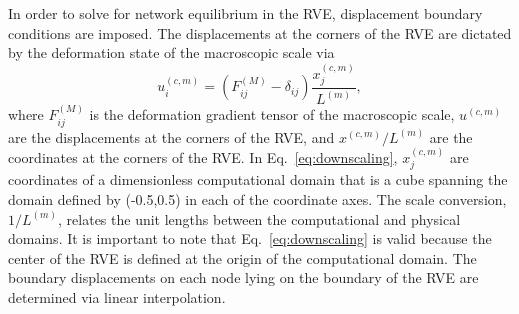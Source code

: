 \documentclass[]{interact}
\begin{document}
In order to solve for network equilibrium in the RVE, displacement boundary conditions are imposed. The displacements at the corners of the RVE are dictated by the deformation state of the macroscopic scale via
%
\begin{equation}
u^{(c,m)}_i = (F^{(M)}_{ij} - \delta_{ij}) \frac{x^{(c,m)}_j}{L^{(m)}},
\label{eq:downscaling}
\end{equation}
%
where $F^{(M)}_{ij}$ is the deformation gradient tensor of the macroscopic scale, $u^{(c,m)}$ are the displacements at the corners of the RVE,  and $x^{(c,m)}/L^{(m)}$ are the coordinates at the corners of the RVE. In Eq.\ \eqref{eq:downscaling}, $x^{(c,m)}_j$ are coordinates of a dimensionless computational domain that is a cube spanning the domain defined by (-0.5,0.5) in each of the coordinate axes. The scale conversion, $1/L^{(m)}$, relates the unit lengths between the computational and physical domains. It is important to note that Eq.\ \eqref{eq:downscaling} is valid because the center of the RVE is defined at the origin of the computational domain. The boundary displacements on each node lying on the boundary of the RVE are determined via linear interpolation. 
\end{document}
